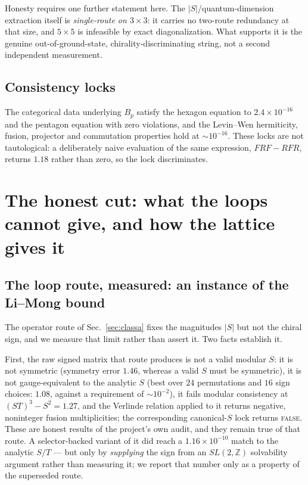 \documentclass[aps,pra,twocolumn,superscriptaddress,longbibliography,floatfix,nofootinbib]{revtex4-2}
\begin{document}
Honesty requires one further statement here. The $|S|$/quantum-dimension
extraction itself is \emph{single-route on $3\times3$}: it carries no
two-route redundancy at that size, and $5\times5$ is infeasible by exact
diagonalization. What supports it is the genuine out-of-ground-state,
chirality-discriminating string, not a second independent measurement.

\subsection{Consistency locks}
\label{sec:locks}

The categorical data underlying $B_p$ satisfy the hexagon equation to
$2.4\times10^{-16}$ and the pentagon equation with zero violations, and the
Levin--Wen hermiticity, fusion, projector and commutation properties hold at
${\sim}10^{-16}$. These locks are not tautological: a deliberately naive
evaluation of the same expression, $FRF-RFR$, returns $1.18$ rather than zero,
so the lock discriminates.

\section{The honest cut: what the loops cannot give, and how the lattice
gives it}
\label{sec:cut}

\subsection{The loop route, measured: an instance of the Li--Mong bound}
\label{sec:wedderburn}

The operator route of Sec.~\ref{sec:classa} fixes the magnitudes $|S|$ but not
the chiral sign, and we measure that limit rather than assert it. Two facts
establish it.

First, the raw signed matrix that route produces is not a valid modular $S$: it
is not symmetric (symmetry error $1.46$, whereas a valid $S$ must be
symmetric), it is not gauge-equivalent to the analytic $S$ (best over $24$
permutations and $16$ sign choices: $1.08$, against a requirement of
${\sim}10^{-2}$), it fails modular consistency at $(ST)^{3}-S^{2}=1.27$, and the
Verlinde relation applied to it returns negative, noninteger fusion
multiplicities; the corresponding canonical-$S$ lock returns \textsc{false}.
These are honest results of the project's own audit, and they remain true of
that route. A selector-backed variant of it did reach a $1.16\times10^{-10}$
match to the analytic $S/T$ --- but only by \emph{supplying} the sign from an
$SL(2,\mathbb{Z})$ solvability argument rather than measuring it; we report that
number only as a property of the superseded route.
\end{document}
